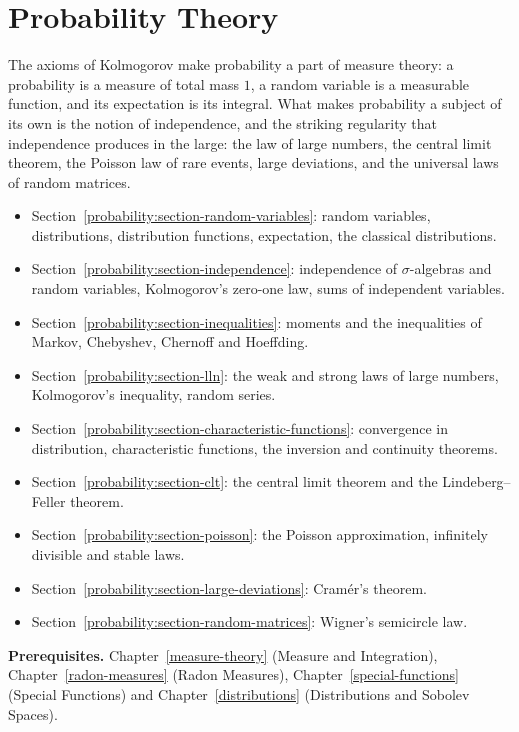 \chapter{Probability Theory}\label{probability}

The axioms of Kolmogorov make probability a part of measure theory: a probability is a measure of total mass $1$, a random variable is a measurable function, and its expectation is its integral. What makes
probability a subject of its own is the notion of independence, and the striking regularity that independence produces in the large: the law of large numbers, the central limit theorem, the Poisson law of rare
events, large deviations, and the universal laws of random matrices.
\begin{itemize}
\item Section~\ref{probability:section-random-variables}: random variables, distributions, distribution functions, expectation, the classical distributions.
\item Section~\ref{probability:section-independence}: independence of $\sigma$-algebras and random variables, Kolmogorov's zero-one law, sums of independent variables.
\item Section~\ref{probability:section-inequalities}: moments and the inequalities of Markov, Chebyshev, Chernoff and Hoeffding.
\item Section~\ref{probability:section-lln}: the weak and strong laws of large numbers, Kolmogorov's inequality, random series.
\item Section~\ref{probability:section-characteristic-functions}: convergence in distribution, characteristic functions, the inversion and continuity theorems.
\item Section~\ref{probability:section-clt}: the central limit theorem and the Lindeberg--Feller theorem.
\item Section~\ref{probability:section-poisson}: the Poisson approximation, infinitely divisible and stable laws.
\item Section~\ref{probability:section-large-deviations}: Cram\'er's theorem.
\item Section~\ref{probability:section-random-matrices}: Wigner's semicircle law.
\end{itemize}

\noindent\textbf{Prerequisites.} Chapter~\ref{measure-theory} (Measure and Integration), Chapter~\ref{radon-measures} (Radon Measures), Chapter~\ref{special-functions} (Special Functions) and Chapter~\ref{distributions}
(Distributions and Sobolev Spaces).

